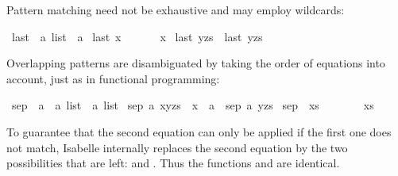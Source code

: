 \begin{isabellebody}
\begin{isamarkuptext}
Pattern matching
need not be exhaustive and may employ wildcards:%
\end{isamarkuptext}%
\isamarkuptrue%
\isamarkupfalse%
\ last\ {\isacharcolon}{\isacharcolon}\ {\isachardoublequoteopen}{\isacharprime}a\ list\ {\isasymRightarrow}\ {\isacharprime}a{\isachardoublequoteclose}\ \isanewline
{\isachardoublequoteopen}last\ {\isacharbrackleft}x{\isacharbrackright}\ \ \ \ \ \ {\isacharequal}\ x{\isachardoublequoteclose}\ {\isacharbar}\isanewline
{\isachardoublequoteopen}last\ {\isacharparenleft}{\isacharunderscore}{\isacharhash}y{\isacharhash}zs{\isacharparenright}\ {\isacharequal}\ last\ {\isacharparenleft}y{\isacharhash}zs{\isacharparenright}{\isachardoublequoteclose}%
\begin{isamarkuptext}%
Overlapping patterns are disambiguated by taking the order of equations into
account, just as in functional programming:%
\end{isamarkuptext}%
\isamarkuptrue%
\isamarkupfalse%
\ sep{}\ {\isacharcolon}{\isacharcolon}\ {\isachardoublequoteopen}{\isacharprime}a\ {\isasymRightarrow}\ {\isacharprime}a\ list\ {\isasymRightarrow}\ {\isacharprime}a\ list{\isachardoublequoteclose}\ \isanewline
{\isachardoublequoteopen}sep{}\ a\ {\isacharparenleft}x{\isacharhash}y{\isacharhash}zs{\isacharparenright}\ {\isacharequal}\ x\ {\isacharhash}\ a\ {\isacharhash}\ sep{}\ a\ {\isacharparenleft}y{\isacharhash}zs{\isacharparenright}{\isachardoublequoteclose}\ {\isacharbar}\isanewline
{\isachardoublequoteopen}sep{}\ {\isacharunderscore}\ xs\ \ \ \ \ \ \ {\isacharequal}\ xs{\isachardoublequoteclose}%
\begin{isamarkuptext}%
\noindent
To guarantee that the second equation can only be applied if the first
one does not match, Isabelle internally replaces the second equation
by the two possibilities that are left:  and
.  Thus the functions  and
 are identical.


\end{isamarkuptext}
\end{isabellebody}
